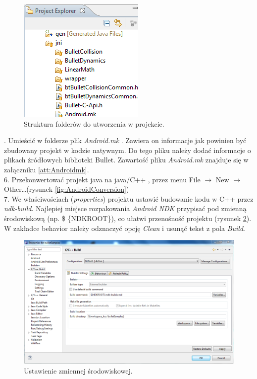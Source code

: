 \begin{figure}[h]
\centering
\includegraphics[scale=1]{./img/bulletFoldery.png}
\caption{Struktura folderów do utworzenia w projekcie.}
\label{fig:FolderTree}
\end{figure}
. Umieścić w folderze plik \emph{Android.mk} . Zawiera on informacje jak
powinien być zbudowany projekt w kodzie natywnym. Do tego pliku należy
dodać informacje o plikach źródłowych biblioteki Bullet. Zawartość pliku
\emph{Android.mk} znajduje się w załączniku \ref{att:Androidmk}.\\

6. Przekonwertować projekt java na java/C++ , przez menu File $ \rightarrow $
New $ \rightarrow $ Other\ldots (rysunek \ref{fig:AndroidConversion})\\
  
7. We właściwościach (\emph{properties}) projektu ustawić budowanie kodu w C++
przez \emph{ndk-build}.
Najlepiej miejsce rozpakowania \emph{Android NDK} przypisać pod zmienną
środowiskową (np. \$ \{NDKROOT\}), co ułatwi przenośność projektu (rysunek
\ref{fig:EnvVariable}). W zakładce behavior należy odznaczyć opcję \emph{Clean}
i usunąć tekst z pola \emph{Build}.\\

\begin{figure}[H]
\centering
\includegraphics[width=\textwidth]{./img/properties.png}
\caption{Ustawienie zmiennej środowiskowej.}
\label{fig:EnvVariable}
\end{figure}

